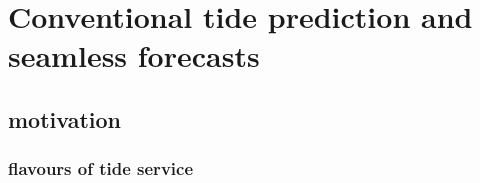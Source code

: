 \chapter{Conventional tide prediction and seamless forecasts}

\section{motivation}

\subsection{flavours of tide service}
